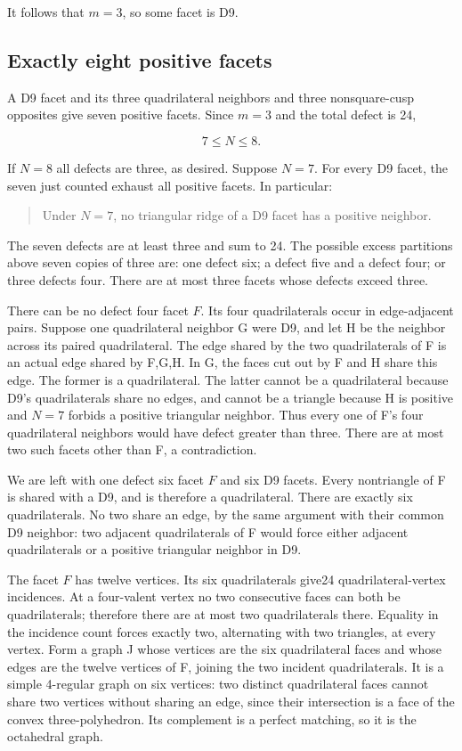 \documentclass[11pt]{article}
\theoremstyle{remark}
\begin{document}
It follows that \textbf{\(m=3\)}, so some facet is D9.

\subsection{Exactly eight positive facets}\label{exactly-eight-positive-facets-all-d9}

A D9 facet and its three quadrilateral neighbors and three nonsquare-cusp opposites give seven positive facets. Since \(m=3\) and the total defect is 24,

\[
 7\le N\le8.
\]

If \(N=8\) all defects are three, as desired. Suppose \(N=7\). For every D9 facet, the seven just counted exhaust all positive facets. In particular:

\begin{quote}
Under \(N=7\), no triangular ridge of a D9 facet has a positive neighbor.
\end{quote}

The seven defects are at least three and sum to 24. The possible excess partitions above seven copies of three are: one defect six; a defect five and a defect four; or three defects four. There are at most three facets whose defects exceed three.

There can be no defect four facet \(F\). Its four quadrilaterals occur in edge-adjacent pairs. Suppose one quadrilateral neighbor G were D9, and let H be the neighbor across its paired quadrilateral. The edge shared by the two quadrilaterals of F is an actual edge shared by F,G,H. In G, the faces cut out by F and H share this edge. The former is a quadrilateral. The latter cannot be a quadrilateral because D9's quadrilaterals share no edges, and cannot be a triangle because H is positive and \(N=7\) forbids a positive triangular neighbor. Thus every one of F's four quadrilateral neighbors would have defect greater than three. There are at most two such facets other than F, a contradiction.

We are left with one defect six facet \(F\) and six D9 facets. Every nontriangle of F is shared with a D9, and is therefore a quadrilateral. There are exactly six quadrilaterals. No two share an edge, by the same argument with their common D9 neighbor: two adjacent quadrilaterals of F would force either adjacent quadrilaterals or a positive triangular neighbor in D9.

The facet \(F\) has twelve vertices. Its six quadrilaterals give24 quadrilateral-vertex incidences. At a four-valent vertex no two consecutive faces can both be quadrilaterals; therefore there are at most two quadrilaterals there. Equality in the incidence count forces exactly two, alternating with two triangles, at every vertex. Form a graph J whose vertices are the six quadrilateral faces and whose edges are the twelve vertices of F, joining the two incident quadrilaterals. It is a simple 4-regular graph on six vertices: two distinct quadrilateral faces cannot share two vertices without sharing an edge, since their intersection is a face of the convex three-polyhedron. Its complement is a perfect matching, so it is the octahedral graph.
\end{document}
